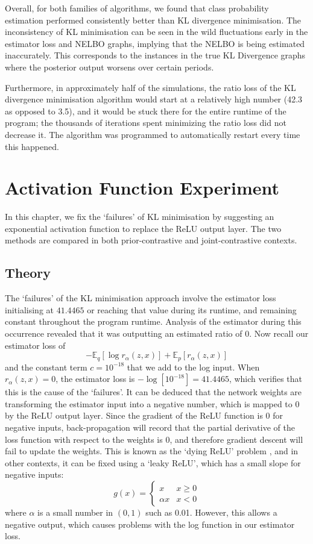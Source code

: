 \documentclass[honours,12pt]{unswthesis}
\newcommand{\E}{\mathbb{E}}
\numberwithin{equation}{section}
\theoremstyle{definition}
\begin{document}
Overall, for both families of algorithms, we found that class probability estimation performed consistently better than KL divergence minimisation. The inconsistency of KL minimisation can be seen in the wild fluctuations early in the estimator loss and NELBO graphs, implying that the NELBO is being estimated inaccurately. This corresponds to the instances in the true KL Divergence graphs where the posterior output worsens over certain periods.

Furthermore, in approximately half of the simulations, the ratio loss of the KL divergence minimisation algorithm would start at a relatively high number (42.3 as opposed to 3.5), and it would be stuck there for the entire runtime of the program; the thousands of iterations spent minimizing the ratio loss did not decrease it. The algorithm was programmed to automatically restart every time this happened.
\newpage
\chapter{Activation Function Experiment}
In this chapter, we fix the `failures' of KL minimisation by suggesting an exponential activation function to replace the ReLU output layer. The two methods are compared in both prior-contrastive and joint-contrastive contexts.
\section{Theory}
The `failures' of the KL minimisation approach involve the estimator loss initialising at $41.4465$ or reaching that value during its runtime, and remaining constant throughout the program runtime. Analysis of the estimator during this occurrence revealed that it was outputting an estimated ratio of $0$. Now recall our estimator loss of
\[-\E_q[\log r_\alpha(z,x)]+\E_p[r_\alpha(z,x)]\]
and the constant term $c=10^{-18}$ that we add to the log input. When $r_\alpha(z,x)=0$, the estimator loss is $-\log [10^{-18}]=41.4465$, which verifies that this is the cause of the `failures'. It can be deduced that the network weights are transforming the estimator input into a negative number, which is mapped to $0$ by the ReLU output layer. Since the gradient of the ReLU function is $0$ for negative inputs, back-propagation will record that the partial derivative of the loss function with respect to the weights is $0$, and therefore gradient descent will fail to update the weights. This is known as the `dying ReLU' problem \citep{sparse}, and in other contexts, it can be fixed using a `leaky ReLU', which has a small slope for negative inputs\citep{leaky}:
\[g(x)=\begin{cases}x & x\geq 0\\ \alpha x & x<0
\end{cases}\]
where $\alpha$ is a small number in $(0,1)$ such as 0.01. However, this allows a negative output, which causes problems with the log function in our estimator loss.
\end{document}
